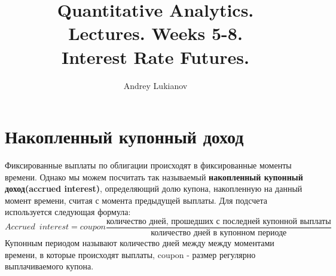 \documentclass{article}
\title{Quantitative Analytics.\\
Lectures. Weeks 5-8. \\
Interest Rate Futures.}
\author{Andrey Lukianov}
\begin{document}
\maketitle

\setcounter{tocdepth}{1} %
\renewcommand\contentsname{Contents}
\tableofcontents
\newpage




\renewcommand{\labelitemi}{\tiny$\bullet$}
\renewcommand{\figurename}{Fig.}

 \section{Накопленный купонный доход}
 Фиксированные выплаты по облигации происходят в фиксированные моменты времени. 
 Однако мы можем посчитать так называемый \textbf{накопленный купонный доход(accrued interest)}, определяющий долю купона, накопленную на данный момент времени, считая с момента предыдущей выплаты.
 Для подсчета используется следующая формула:
 $$Accrued \enspace interest = coupon \frac{\text{количество дней, прошедших с последней купонной выплаты}}{\text{количество дней в купонном периоде}}$$
 Купонным периодом называют количество дней между между моментами времени, в которые происходят выплаты, coupon - размер регулярно выплачиваемого купона.
 
\end{document}
